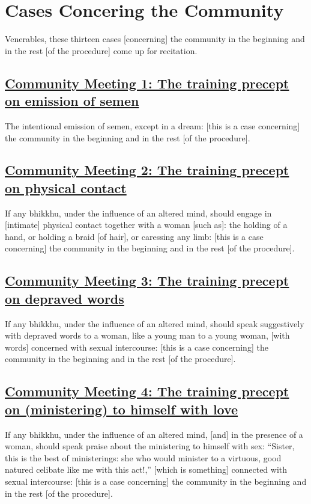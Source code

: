 \section{Cases Concering the Community}
\label{comm}

\begin{intro}
  Venerables, these thirteen cases [concerning] the community in the beginning and in the rest [of the procedure] come up for recitation.
\end{intro}

\subsection*{\hyperref[sd1]{Community Meeting 1: The training precept on emission of semen}}
\label{comm1}
The intentional emission of semen, except in a dream: [this is a case concerning] the community in the beginning and in the rest [of the procedure].

\subsection*{\hyperref[sd2]{Community Meeting 2: The training precept on physical contact}}
\label{comm2}
If any bhikkhu, under the influence of an altered mind, should engage in [intimate] physical contact together with a woman [such as]: the holding of a hand, or holding a braid [of hair], or caressing any limb: [this is a case concerning] the community in the beginning and in the rest [of the procedure].

\subsection*{\hyperref[sd3]{Community Meeting 3: The training precept on depraved words}}
\label{comm3}
If any bhikkhu, under the influence of an altered mind, should speak suggestively with depraved words to a woman, like a young man to a young woman, [with words] concerned with sexual intercourse: [this is a case concerning] the community in the beginning and in the rest [of the procedure].

\subsection*{\hyperref[sd4]{Community Meeting 4: The training precept on (ministering) to himself with love}}
\label{comm4}
If any bhikkhu, under the influence of an altered mind, [and] in the presence of a woman, should speak praise about the ministering to himself with sex: ``Sister, this is the best of ministerings: she who would minister to a virtuous, good natured celibate like me with this act!,'' [which is something] connected with sexual intercourse: [this is a case concerning] the community in the beginning and in the rest [of the procedure].

